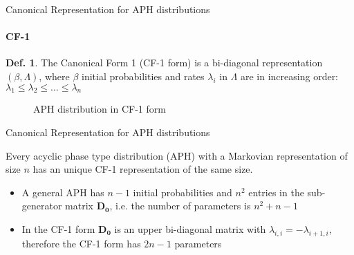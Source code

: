 \documentclass[envcountset]{beamer}
\theoremstyle{definition}
\newtheorem{mydef}{Def.}[theorem]
\begin{document}
\begin{frame}{Canonical Representation for APH distributions}
\framesubtitle{CF-1}

\begin{mydef}
The Canonical Form 1 (CF-1 form) is a bi-diagonal representation $(\beta, \Lambda)$, where $\beta$ initial probabilities and rates $\lambda_i$ in $\Lambda$ are in increasing order: $\lambda_1 \leq \lambda_2 \leq \ldots \leq \lambda_n$
\end{mydef}


\begin{figure}
\centering
{}
\caption{APH distribution in CF-1 form}
\end{figure}

\end{frame}

\begin{frame}{Canonical Representation for APH distributions}

\begin{framed}
Every acyclic phase type distribution (APH) with a Markovian representation of size $n$ has an unique CF-1 representation of the same size.
\end{framed}
\begin{itemize}
\item A general APH has $n-1$ initial probabilities and $n^2$ entries in the sub-generator matrix $\mathbf{D_0}$, i.e. the number of parameters is $n^2+n-1$

\item In the CF-1 form $\mathbf{D_0}$ is an upper bi-diagonal matrix with $\lambda_{i,i}=-\lambda_{i+1,i}$, therefore the CF-1 form has $2n-1$ parameters
\end{itemize}
\end{frame}
\end{document}
